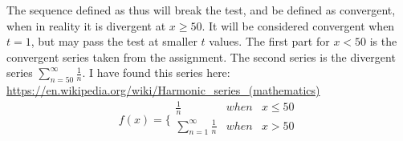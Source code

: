 The sequence defined as thus will break the test, and be defined as convergent, when in reality it is divergent at $x\geq 50$. It will be  considered convergent when $t = 1$, but may pass the test at smaller $t$ values. The first part for $x < 50$ is the convergent series taken from the assignment. The second series is the divergent series $\sum_{n=50}^\infty \frac{1}{n}$. I have found this series here: \url{https://en.wikipedia.org/wiki/Harmonic_series_(mathematics)}
$$
f(x) =
\Bigg\{
\begin{array}{rrr}
\frac{1}{n} & when & x \leq 50\\
\sum_{n=1}^\infty \frac{1}{n} & when & x > 50	\\
\end{array}
$$
